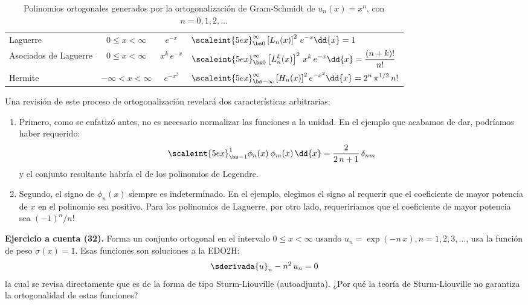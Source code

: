\begin{landscape}
\begin{table}[H]
{\begin{tabular}{p{5cm} c c p{10cm}}
Laguerre & $0 \leq x < \infty $ & $e^{-x}$ & $\displaystyle \scaleint{5ex}_{\bs 0}^{\infty} \left[ L_{n} (x) \right]^{2} \, e^{-x} \dd{x} =  1 $ \\
Asociados de Laguerre & $0 \leq x < \infty $ & $x^{k} \, e^{-x}$ & $\displaystyle \scaleint{5ex}_{\bs 0}^{\infty} \left[ L_{n}^{k} (x) \right]^{2} \, x^{k} \, e^{-x} \dd{x} = \dfrac{(n + k)!}{n!} $ \\
Hermite & $- \infty < x < \infty $ & $e^{-x^{2}}$ & $\displaystyle \scaleint{5ex}_{\bs -\infty}^{\infty} \left[ H_{n} (x) \right]^{2} e^{-x^{2}} \dd{x} = 2^{n} \, \pi^{1/2} \, n! $
\end{tabular}}
\caption{Polinomios ortogonales generados por la ortogonalización de Gram-Schmidt de $u_{n}(x)= x^{n}$, con $n=0,1,2,\ldots$}
\label{tabla:tabla_03}
\end{table}
\end{landscape}
Una revisión de este proceso de ortogonalización revelará dos características arbitrarias:
\begin{enumerate}
\item Primero, como se enfatizó antes, no es necesario normalizar las funciones a la unidad. En el ejemplo que acabamos de dar, podríamos haber requerido:
\begin{align}
\scaleint{5ex}_{\bs -1}^{1} \phi_{n} (x) \: \phi_{m} (x) \, \dd{x} = \dfrac{2}{2 \, n +1} \, \delta_{nm}
\label{eq:ecuacion_10_61}
\end{align}
y el conjunto resultante habría el de los polinomios de Legendre.
\item Segundo, el signo de $\phi_{n} (x)$ siempre es indeterminado. En el ejemplo, elegimos el signo al requerir que el coeficiente de mayor potencia de $x$ en el polinomio sea positivo. Para los polinomios de Laguerre, por otro lado, requeriríamos que el coeficiente de mayor potencia sea $(-1)^{n}/n!$
\end{enumerate}
\vspace*{0.5cm}
\textbf{Ejercicio a cuenta (32). } Forma un conjunto ortogonal en el intervalo $0 \leq x < \infty$ usando $u_{n} = \exp(-n \, x), n = 1, 2, 3, \ldots$, usa la función de peso $\sigma(x) = 1$. Esas funciones son soluciones a la EDO2H:
\begin{align*}
\sderivada{u}_{n} - n^{2} \, u_{n} = 0
\end{align*}
la cual se revisa directamente que es de la forma de tipo Sturm-Liouville (autoadjunta). ¿Por qué la teoría de Sturm-Liouville no garantiza la ortogonalidad de estas funciones?
